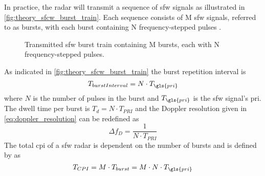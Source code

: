 \documentclass[class=report,11pt,crop=false]{standalone}
\begin{document}
    In practice, the radar will transmit a sequence of \gls{sfw} signals as illustrated in \autoref{fig:theory_sfcw_burst_train}. Each sequence consists of M \gls{sfw} signals, referred to as bursts, with each burst containing N frequency-stepped pulses \cite{ISARtextbook_Martorella}.
    \begin{figure}[h]
        \centering
        \resizebox{0.8\linewidth}{!}{}
        \caption{Transmitted \gls{sfw} burst train containing M bursts, each with N frequency-stepped pulses.  \label{fig:theory_sfcw_burst_train}}
    \end{figure}
    As indicated in \autoref{fig:theory_sfcw_burst_train} the burst repetition interval is 
    \begin{equation}  \label{eq:bri_sfw}
        T_{burstInterval} = N \cdot T_{\gls{pri}} 
    \end{equation}
    where $N$ is the number of pulses in the burst and $T_{\gls{pri}}$ is the \gls{sfw} signal's \gls{pri}. The dwell time per burst is \(T_d = N \cdot T_{PRI}\) \cite{pomr} %
    and the Doppler resolution given in
    \autoref{eq:doppler_resolution} can be redefined as
    \begin{equation} \label{eq:doppler_resolution_sfw}
        \Delta f_D = \frac{1}{N \cdot T_{PRI}}
    \end{equation}
    The total \gls{cpi} of a \gls{sfw} radar is dependent on the number of bursts and is defined by \cite{ISARtextbook_Matlab} as
    \begin{equation}  \label{eq:cpi_sfw}
        T_{CPI} = M \cdot T_{burst} = M \cdot N \cdot T_{\gls{pri}}
    \end{equation}

\end{document}
